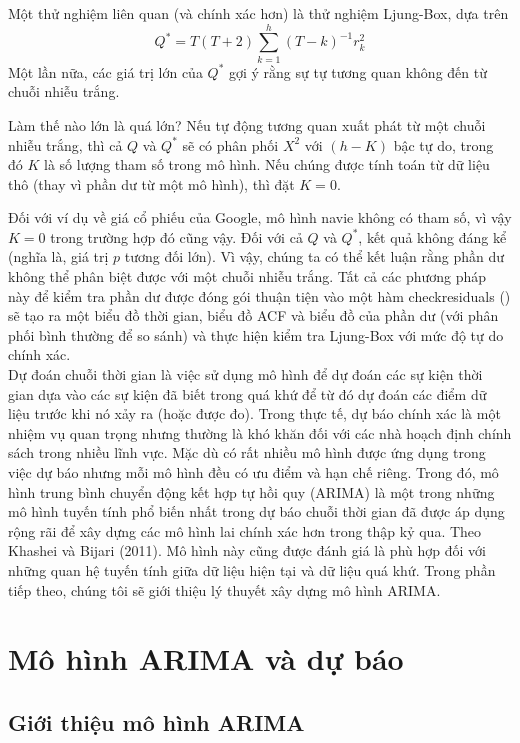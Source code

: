 \documentclass[12pt, a4paper,oneside]{book}
\theoremstyle{definition}
\begin{document}
Một thử nghiệm liên quan (và chính xác hơn) là thử nghiệm Ljung-Box, dựa trên	
$$Q^{*}=T(T+2)\sum _ {k = 1 } ^ { h }(T-k)^{-1}r_{k}^{2}$$
Một lần nữa, các giá trị lớn của $Q^{*}$ gợi ý rằng sự tự tương quan không đến từ chuỗi nhiễu trắng.

Làm thế nào lớn là quá lớn? Nếu tự động tương quan xuất phát từ một chuỗi nhiễu trắng, thì cả $Q$ và $Q^{*}$ sẽ có phân phối $X^{2}$ với $(h − K)$ bậc tự do, trong đó $K$ là số lượng tham số trong mô hình. Nếu chúng được tính toán từ dữ liệu thô (thay vì phần dư từ một mô hình), thì đặt $K = 0$.

Đối với ví dụ về giá cổ phiếu của Google, mô hình navie không có tham số, vì vậy $K = 0$ trong trường hợp đó cũng vậy.
Đối với cả $Q$ và $Q^{*}$, kết quả không đáng kể (nghĩa là, giá trị $p$ tương đối lớn). Vì vậy, chúng ta có thể kết luận rằng phần dư không thể phân biệt được với một chuỗi nhiễu trắng.
Tất cả các phương pháp này để kiểm tra phần dư được đóng gói thuận tiện vào một hàm checkresiduals () sẽ tạo ra một biểu đồ thời gian, biểu đồ ACF và biểu đồ của phần dư (với phân phối bình thường để so sánh) và thực hiện kiểm tra Ljung-Box với mức độ tự do chính xác.
\\

Dự đoán chuỗi thời gian là việc sử dụng mô hình để dự đoán các sự kiện thời gian dựa vào các sự kiện đã biết trong quá khứ để từ đó dự đoán các điểm dữ liệu trước khi nó xảy ra (hoặc được đo). Trong thực tế, dự báo chính xác là một nhiệm vụ quan trọng nhưng thường là khó khăn đối với các nhà hoạch định chính sách trong nhiều lĩnh vực. Mặc dù có rất nhiều mô hình được ứng dụng trong việc dự báo nhưng mỗi mô hình đều có ưu điểm và hạn chế riêng. Trong đó, mô hình trung bình chuyển động kết hợp tự hồi quy (ARIMA) là một trong những mô hình tuyến tính phổ biến nhất trong dự báo chuỗi thời gian đã được áp dụng rộng rãi để xây dựng các mô hình lai chính xác hơn trong thập kỷ qua. Theo Khashei và Bijari (2011). Mô hình này cũng được đánh giá là phù hợp đối với những quan hệ tuyến tính giữa dữ liệu hiện tại và dữ liệu quá khứ. Trong phần tiếp theo, chúng tôi sẽ giới thiệu lý thuyết xây dựng mô hình ARIMA.
\section{Mô hình ARIMA và dự báo}
\subsection{Giới thiệu mô hình ARIMA}
\end{document}
